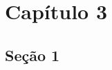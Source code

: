 \documentclass[12pt, a4paper]{report}
\begin{document}
\chapter{Capítulo 3}
	

\section{Seção 1}




\nocite{Lucas1, Lucas2, Bonola}


\newpage
\renewcommand{\refname}{Referências Bibliográficas}

\end{document}
